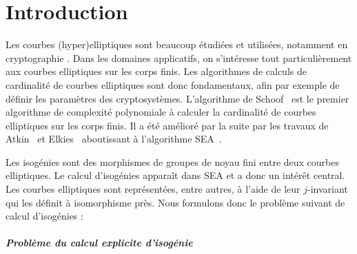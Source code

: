 \documentclass[10pt,a4paper]{book}
\theoremstyle{plain}
\theoremstyle{definition}
\theoremstyle{definition}
\theoremstyle{definition}
\theoremstyle{definition}
\theoremstyle{definition}
\theoremstyle{remark}
\theoremstyle{remark}
\theoremstyle{definition}
\begin{document}


\printnomenclature



\chapter*{Introduction}


Les courbes (hyper)elliptiques sont beaucoup étudiées et utilisées, notamment en 
cryptographie \cite{Miller85,Koblitz87,Koblitz89}. Dans les domaines applicatifs, 
on s'intéresse tout particulièrement aux courbes elliptiques sur les corps finis. 
Les algorithmes de calculs de cardinalité de courbes elliptiques sont donc 
fondamentaux, afin par exemple de définir les paramètres des cryptosystèmes. 
L'algorithme de Schoof~\cite{Schoof85} est le premier algorithme de complexité
polynomiale à calculer la cardinalité de courbes elliptiques sur les corps 
finis. Il a été amélioré par la suite par les travaux de Atkin~\cite{Atkin88} 
et Elkies~\cite{Elkies91} aboutissant à l'algorithme SEA~\cite{Schoof95}.

Les isogénies sont des morphismes de groupes de noyau fini entre deux courbes 
elliptiques. Le calcul d'isogénies apparaît dans SEA et a donc un intérêt 
central. Les courbes elliptiques sont représentées, entre autres, à l'aide de 
leur $j$-invariant qui les définit à isomorphisme près. Nous formulons donc le 
problème suivant de calcul d'isogénies :

\paragraph{Problème du calcul explicite d'isogénie}
\end{document}

